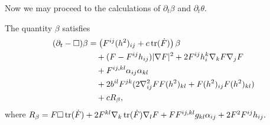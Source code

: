\documentclass{amsart}
\begin{document}
Now we may proceed to the calculations of \(\partial_t \beta\) and \(\partial_t \theta\).
\begin{lemma}
\label{lem:evbeta}
The quantity $\beta$
satisfies
\[
\begin{split}
(\partial_{t} - \Box)\beta &= \left(F^{ij}(h^2)_{ij} + c\operatorname{tr}(\dot{F}) \right)\beta \\
&\quad + (F - F^{ij}h_{ij}) |\nabla F|^{2} + 2F^{ij}h^{k}_{i}\nabla_k F \nabla_j F \\
&\quad + F^{ij,kl} \alpha_{ij} \alpha_{kl} \\
&\quad + 2b^{il}F^{jk} (2\nabla^2_{ij}FF(h^2)_{kl} + F(h^2)_{ij}F(h^2)_{kl}) \\
&\quad + cR_{\beta},
\end{split}
\]
where
$
R_{\beta} = F \Box \operatorname{tr}(\dot{F}) + 2F^{kl} \nabla_k \operatorname{tr}(\dot{F}) \nabla_l F + F F^{ij,kl}g_{kl} \alpha_{ij} + 2F^{2}F^{ij}h_{ij}.
$
\end{lemma}
\end{document}
